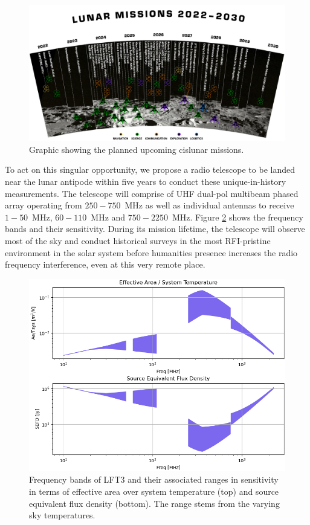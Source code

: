 \begin{figure}
    \centering
    \includegraphics[width=0.95\linewidth]{figures/missions.png}
    \caption{Graphic showing the planned upcoming cislunar missions.}
    \label{fig:missions}
\end{figure}

To act on this singular opportunity, we propose a radio telescope to be landed near the lunar antipode within five years to conduct these unique-in-history measurements. The telescope will comprise of UHF dual-pol multibeam phased array operating from $250-750$~MHz as well as individual antennas to receive $1-50$~MHz, $60-110$~MHz and $750-2250$~MHz. Figure \ref{fig:freqbands} shows the frequency bands and their sensitivity.  During its mission lifetime, the telescope will observe most of the sky and conduct historical surveys in the most RFI-pristine environment in the solar system before humanities presence increases the radio frequency interference, even at this very remote place.

\begin{figure}
    \centering
    \includegraphics[width=0.75\linewidth]{figures/freqbands.png}
    \caption{Frequency bands of LFT3 and their associated ranges in sensitivity in terms of effective area over system temperature (top) and source equivalent flux density (bottom). The range stems from the varying sky temperatures.}
    \label{fig:freqbands}
\end{figure}

